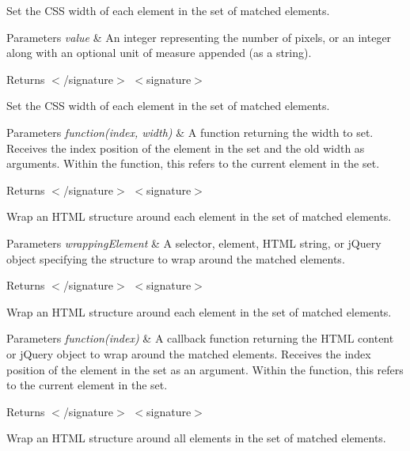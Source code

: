 Set the C\+SS width of each element in the set of matched elements.


\begin{DoxyParams}{Parameters}
{\em value} & An integer representing the number of pixels, or an integer along with an optional unit of measure appended (as a string).\\
\hline
\end{DoxyParams}
\begin{DoxyReturn}{Returns}
$<$/signature$>$ $<$signature$>$ 

Set the C\+SS width of each element in the set of matched elements.
\end{DoxyReturn}

\begin{DoxyParams}{Parameters}
{\em function(index, width)} & A function returning the width to set. Receives the index position of the element in the set and the old width as arguments. Within the function, this refers to the current element in the set.\\
\hline
\end{DoxyParams}
\begin{DoxyReturn}{Returns}
$<$/signature$>$ $<$signature$>$ 

Wrap an H\+T\+ML structure around each element in the set of matched elements.
\end{DoxyReturn}

\begin{DoxyParams}{Parameters}
{\em wrapping\+Element} & A selector, element, H\+T\+ML string, or j\+Query object specifying the structure to wrap around the matched elements.\\
\hline
\end{DoxyParams}
\begin{DoxyReturn}{Returns}
$<$/signature$>$ $<$signature$>$ 

Wrap an H\+T\+ML structure around each element in the set of matched elements.
\end{DoxyReturn}

\begin{DoxyParams}{Parameters}
{\em function(index)} & A callback function returning the H\+T\+ML content or j\+Query object to wrap around the matched elements. Receives the index position of the element in the set as an argument. Within the function, this refers to the current element in the set.\\
\hline
\end{DoxyParams}
\begin{DoxyReturn}{Returns}
$<$/signature$>$ $<$signature$>$ 

Wrap an H\+T\+ML structure around all elements in the set of matched elements.
\end{DoxyReturn}

